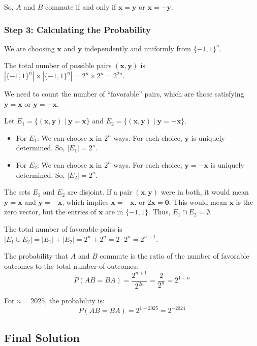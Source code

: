 \documentclass[12pt,a4paper]{article}
\theoremstyle{definition}
\begin{document}
        So, $A$ and $B$ commute if and only if $\mathbf{x}=\mathbf{y}$ or $\mathbf{x}=-\mathbf{y}$.

        \subsubsection*{Step 3: Calculating the Probability}

        We are choosing $\mathbf{x}$ and $\mathbf{y}$ independently and uniformly from $\{-1, 1\}^n$.

        The total number of possible pairs $(\mathbf{x}, \mathbf{y})$ is $|\{-1, 1\}^n| \times |\{-1, 1\}^n| = 2^n \times 2^n = 2^{2n}$.

        We need to count the number of ``favorable'' pairs, which are those satisfying $\mathbf{y}=\mathbf{x}$ or $\mathbf{y}=-\mathbf{x}$.

        Let $E_1 = \{(\mathbf{x}, \mathbf{y}) \mid \mathbf{y}=\mathbf{x}\}$ and $E_2 = \{(\mathbf{x}, \mathbf{y}) \mid \mathbf{y}=-\mathbf{x}\}$.

        \begin{itemize}
            \item For $E_1$: We can choose $\mathbf{x}$ in $2^n$ ways. For each choice, $\mathbf{y}$ is uniquely determined. So, $|E_1| = 2^n$.
            \item For $E_2$: We can choose $\mathbf{x}$ in $2^n$ ways. For each choice, $\mathbf{y}=-\mathbf{x}$ is uniquely determined. So, $|E_2| = 2^n$.
        \end{itemize}

        The sets $E_1$ and $E_2$ are disjoint. If a pair $(\mathbf{x}, \mathbf{y})$ were in both, it would mean $\mathbf{y}=\mathbf{x}$ and $\mathbf{y}=-\mathbf{x}$, which implies $\mathbf{x}=-\mathbf{x}$, or $2\mathbf{x}=\mathbf{0}$. This would mean $\mathbf{x}$ is the zero vector, but the entries of $\mathbf{x}$ are in $\{-1, 1\}$. Thus, $E_1 \cap E_2 = \emptyset$.

        The total number of favorable pairs is $|E_1 \cup E_2| = |E_1| + |E_2| = 2^n + 2^n = 2 \cdot 2^n = 2^{n+1}$.

        The probability that $A$ and $B$ commute is the ratio of the number of favorable outcomes to the total number of outcomes:
        $$P(AB=BA) = \frac{2^{n+1}}{2^{2n}} = \frac{2}{2^n} = 2^{1-n}$$

        For $n=2025$, the probability is:
        $$P(AB=BA) = 2^{1-2025} = 2^{-2024}$$

\subsection{Final Solution}
\end{document}
